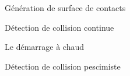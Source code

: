 \begin{frame}{Génération de surface de contacts}
\end{frame}

\begin{frame}{Détection de collision continue}
\end{frame}

\begin{frame}{Le démarrage à chaud}
\end{frame}

\begin{frame}{Détection de collision pescimiste}
\end{frame}
